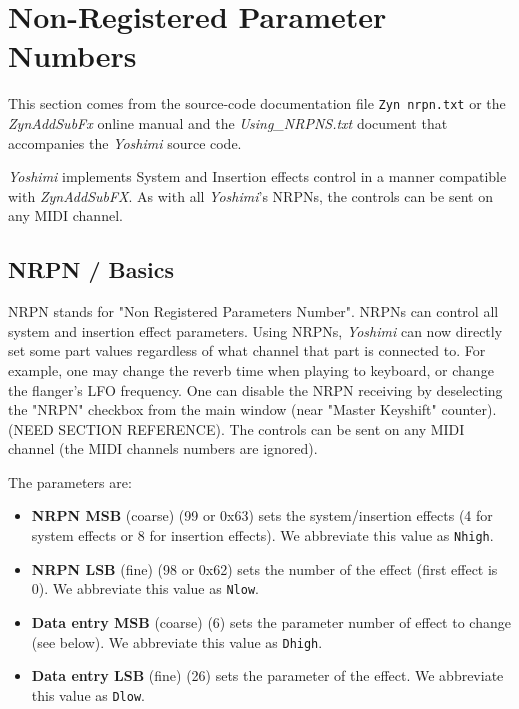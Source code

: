 %
%
%

\section{Non-Registered Parameter Numbers}
\label{sec:nrpns}

   This section comes from the source-code documentation file
   \texttt{Zyn nrpn.txt} or the \textsl{ZynAddSubFx}
   online manual \cite{zyndoc} and the \textsl{Using\_NRPNS.txt} document that
   accompanies the \textsl{Yoshimi} source code.

   \textsl{Yoshimi} implements System and Insertion effects control in a
   manner compatible with \textsl{ZynAddSubFX}. As with all
   \textsl{Yoshimi}'s NRPNs, the controls can be sent on any MIDI channel.

\subsection{NRPN / Basics}
\label{subsection:nrpns_midi_nrpn_basics}

   NRPN stands for "Non Registered Parameters Number".
   NRPNs can control all system and insertion effect parameters.
   Using NRPNs, \textsl{Yoshimi} can now directly set some part values
   regardless of what channel that part is connected to.  For example, one
   may change the reverb time when playing to keyboard, or
   change the flanger's LFO frequency.
   One can disable the NRPN receiving by deselecting the "NRPN" checkbox
   from the main window (near "Master Keyshift" counter).
   (NEED SECTION REFERENCE).
   The controls can be sent on any MIDI channel 
   (the MIDI channels numbers are ignored).

   The parameters are:

   \begin{itemize}
      \item \textbf{NRPN MSB}
      (coarse) (99 or 0x63) sets the system/insertion effects
      (4 for system effects or 8 for insertion effects).
      We abbreviate this value as \texttt{Nhigh}.
      \item \textbf{NRPN LSB}
      (fine) (98 or 0x62) sets the number of the effect (first
      effect is 0).
      We abbreviate this value as \texttt{Nlow}.
      \item \textbf{Data entry MSB}
      (coarse) (6) sets the parameter number of effect to
      change (see below).
      We abbreviate this value as \texttt{Dhigh}.
      \item \textbf{Data entry LSB}
      (fine) (26) sets the parameter of the effect.
      We abbreviate this value as \texttt{Dlow}.
   \end{itemize}

